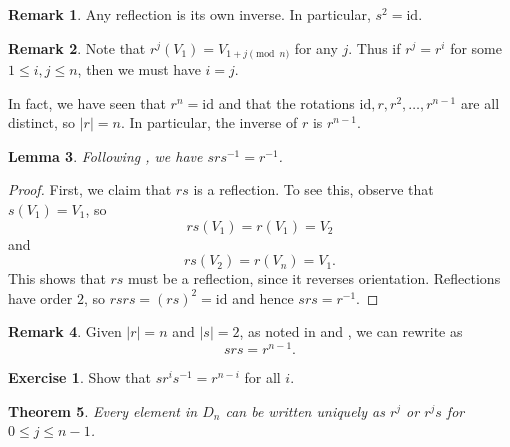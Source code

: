\documentclass[12pt]{report}
\newtheorem{theorem}{Theorem}[chapter]
\newtheorem{lemma}[theorem]{Lemma}
\numberwithin{equation}{section}
\numberwithin{theorem}{chapter}
\theoremstyle{definition}
\newtheorem{exercise}{Exercise}
\newtheorem*{basic properties}{Basic Properties}
\newtheorem*{Important Remark}{Important Remark}
\newtheorem{remark}[theorem]{Remark}
\begin{document}
\begin{remark}\label{reflections have order 2}
	Any reflection is its own inverse. In particular, $s^2 = \mathrm{id}$.
\end{remark}

\begin{remark}\label{rotations have order n}
	Note that $r^j(V_1) = V_{1+j \pmod{n}}$ for any $j$. Thus if $r^j = r^i$ for some $1 \leqslant i,j \leqslant n$, then we must have $i=j$.	

	In fact, we have seen that $r^n = \mathrm{id}$ and that the rotations $\mathrm{id}, r, r^2, \ldots, r^{n-1}$ are all distinct, so $|r| = n$. In particular, the inverse of $r$ is $r^{n-1}$.
\end{remark}



\begin{lemma}\label{dihedral groups product lemma}
Following , we have $srs^{-1} = r^{-1}$.
\end{lemma}

\begin{proof}


First, we claim that $rs$ is a reflection. To see this, observe that $s(V_1) = V_1$, so
$$rs(V_1) = r(V_1) = V_2$$ 
and 
$$rs(V_{2}) = r(V_{n}) = V_1.$$
This shows that $rs$ must be a reflection, since it reverses orientation.
Reflections have order $2$, so $rsrs = (rs)^2 = \mathrm{id}$ and hence $srs = r^{-1}$.
\end{proof}


\begin{remark}
	Given $|r| = n$ and $|s| = 2$, as noted in  and , we can rewrite  as
	$$srs = r^{n-1}.$$
\end{remark}


\begin{exercise}\label{conjugate r^i by s}
	Show that $s r^i s^{-1} = r^{n-i}$ for all $i$.
\end{exercise}


\begin{theorem}\label{Dnelements in terms of r and s}
Every element in $D_n$ can be written uniquely as $r^j$ or $r^js$ for $0 \leqslant j \leqslant n-1$.
\end{theorem}
\end{document}
